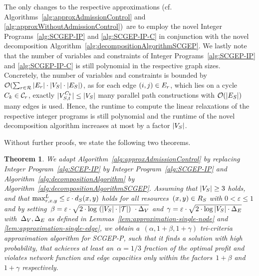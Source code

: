 \documentclass[10pt, conference, letterpaper]{IEEEtran}
\newtheorem{theorem}{Theorem}
\begin{document}
The only changes to the respective approximations (cf. Algorithms~\ref{alg:approxAdmissionControl} and \ref{alg:approxWithoutAdmissionControl})~are to employ the novel Integer Programs~\ref{alg:SCGEP-IP} and \ref{alg:SCGEP-IP-C} in conjunction with the novel decomposition Algorithm~\ref{alg:decompositionAlgorithmSCGEP}. We lastly note that the number of variables and constraints of Integer Programs~\ref{alg:SCGEP-IP} and \ref{alg:SCGEP-IP-C} is still polynomial in the respective graph sizes. Concretely, the number of variables and constraints is bounded by $\mathcal{O}(\sum_{r \in \mathcal{R}} |E_{r}| \cdot |V_S| \cdot |E_S|)$, as for each edge $(i,j) \in  E_{r}$, which lies on a cycle $C_k \in \Cycles$, exactly $|V^{C_k}_{S,t} | \leq |V_S|$ many parallel path constructions with $\mathcal{O}(|E_S|)$ many edges is used. Hence, the runtime to compute the linear relaxations of the respective integer programs is still polynomial and the runtime of the novel decomposition algorithm increases at most by a factor $|V_S|$.

Without further proofs, we state the following two theorems.

\begin{theorem}
\label{thm:result-for-admission-control-scgep}
We adapt Algorithm~\ref{alg:approxAdmissionControl} by replacing Integer Program~\ref{alg:SCEP-IP} by Integer Program~\ref{alg:SCGEP-IP} and Algorithm~\ref{alg:decompositionAlgorithm} by Algorithm~\ref{alg:decompositionAlgorithmSCGEP}.
Assuming that $|V_S| \geq 3$ holds, and that $\maxLoadV[\req][x][y] \leq \varepsilon \cdot \Scap(x,y)$ holds for all resources~$(x,y) \in  R_{S}$ with $0 < \varepsilon \leq 1$ and by setting~$\beta = \varepsilon \cdot \sqrt{2\cdot \log~(|V_S|\cdot|\mathcal{T}|)~\cdot \Delta_V  }$ and~$\gamma = \varepsilon \cdot \sqrt{2\cdot \log |V_S| \cdot \Delta_E  }$ with~$\Delta_V,\Delta_E$ as defined in Lemmas~\ref{lem:approximation-single-node} and \ref{lem:approximation-single-edge}, we obtain a~$(\alpha,1+\beta,1+\gamma)$ tri-criteria approximation algorithm for  SCGEP-P, such that it finds a solution \emph{with high probability}, that achieves at least an~$\alpha = 1/3$ fraction of the optimal profit and violates network function and edge capacities only within the factors~$1+\beta$ and~$1+\gamma$ respectively.
\end{theorem}
\end{document}
